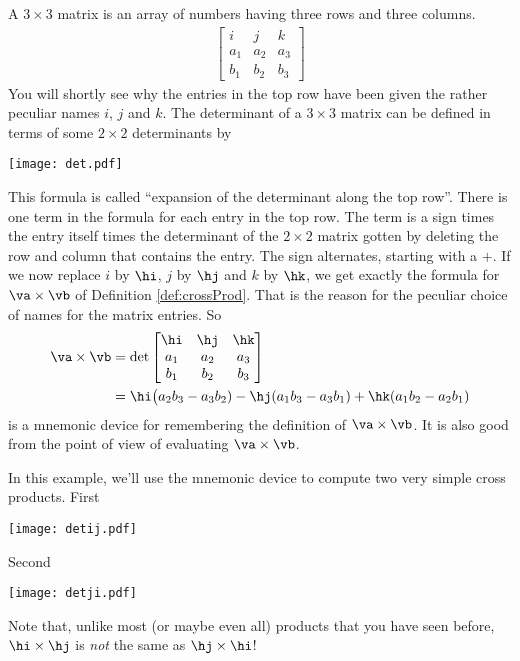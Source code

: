 A $3\times 3$ matrix is an array of
numbers having three rows and three columns.
\begin{align*}
 \left[\begin{matrix}i& j &k\\ a_1&a_2&a_3\\ b_1&b_2&b_3\end{matrix}\right]
\end{align*}
You will shortly see why the entries in the top row have been given the
rather peculiar names $i$, $j$ and $k$. The determinant of a $3\times 3$ 
matrix can be defined in terms of some $2\times 2$ determinants by
      \begin{center}
      \texttt{[image: det.pdf]}
      \end{center}
This formula is called ``expansion of the determinant along the top row''. 
There is one term in the formula for each entry in the top row. The term is
a sign times the entry itself times the determinant of the $2\times 2$ matrix
gotten by deleting the row and column that contains the entry. The sign
alternates, starting with a $+$. If we now replace $i$ by $\hi$, $j$ by $\hj$ 
and $k$ by $\hk$, we get exactly the formula for $\va\times \vb$
of Definition \ref{def:crossProd}. That is the reason for the peculiar 
choice of names for the matrix entries. So
\begin{align*}
\va\times\vb
&=\det\left[\begin{matrix}\hi& \hj &\hk\\ 
                            a_1&a_2&a_3\\ 
                            b_1&b_2&b_3\end{matrix}\right] \\
&=\hi\big(a_2b_3-a_3b_2) -\hj(a_1b_3-a_3b_1) +\hk(a_1b_2-a_2b_1)
\end{align*}
is a mnemonic device for remembering the definition of $\va\times\vb$.
It is also good from the point of view of 
evaluating $\va\times\vb$.

\begin{eg}\label{eg:GEOcrossijji}
In this example, we'll use the mnemonic device to compute two very simple cross
products. First
      \begin{center}
      \texttt{[image: detij.pdf]}
      \end{center}
Second
      \begin{center}
      \texttt{[image: detji.pdf]}
      \end{center}
Note that, unlike most (or maybe even all) products that you have seen before, $\hi\times\hj$ is \emph{not} the same as $\hj\times\hi$!
\end{eg}


